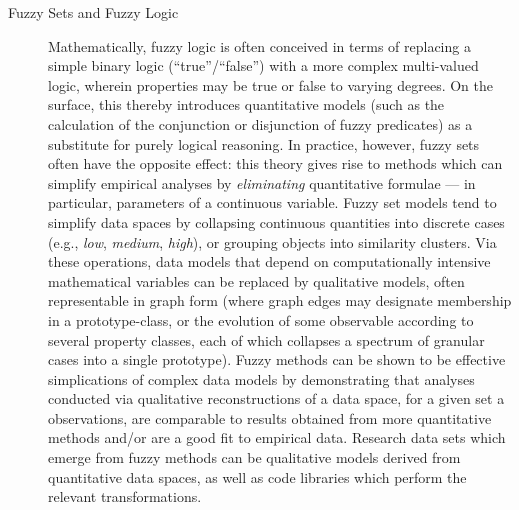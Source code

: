 \documentclass[11pt,letterpaper]{article}
\newcommand{\q}[1]{{\fontfamily{qcr}\selectfont ``}#1{\fontfamily{qcr}\selectfont ''}}
\begin{document}
{{\begin{description}
\item[Fuzzy Sets and Fuzzy Logic]  Mathematically, 
fuzzy logic is often conceived in terms of replacing a 
simple binary logic (\q{true}/\q{false}) with a 
more complex multi-valued logic, wherein properties 
may be true or false to varying degrees.  On the 
surface, this thereby introduces quantitative models 
(such as the calculation of the conjunction or disjunction 
of fuzzy predicates) as a substitute for purely 
logical reasoning.  In practice, however, fuzzy 
sets often have the opposite effect: this theory 
gives rise to methods which can simplify empirical 
analyses by \textit{eliminating} quantitative 
formulae --- in particular, parameters of a continuous 
variable.  Fuzzy set models tend to simplify data 
spaces by collapsing continuous quantities into discrete 
cases (e.g., \textit{low}, \textit{medium}, \textit{high}), 
or grouping objects into similarity clusters.  
Via these operations, data models that depend on 
computationally intensive mathematical variables 
can be replaced by qualitative models, often 
representable in graph form (where graph edges 
may designate membership in a prototype-class, 
or the evolution of some observable according to 
several property classes, each of which 
collapses a spectrum of granular cases into a single 
prototype).  Fuzzy methods can be shown to be 
effective simplications of complex data models 
by demonstrating that analyses conducted via 
qualitative reconstructions of a data space, 
for a given set a observations, 
are comparable to results obtained from more 
quantitative methods and/or are a good fit to 
empirical data.  Research data sets which emerge 
from fuzzy methods can be qualitative models 
derived from quantitative data spaces, as 
well as code libraries which perform the relevant 
transformations.


\end{description}}}
\end{document}
